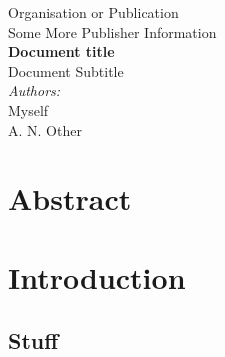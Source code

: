 \documentclass[a4paper, 11pt]{article}
\begin{document}
	
\begin{titlepage}
\begin{center}
	{\LARGE Organisation or Publication}\\[0.2cm]
	{\Large Some More Publisher Information}\\[1cm]
	{ \huge \bfseries Document title}\\[0.3cm]
	{ \large Document Subtitle}\\[0.7cm]
	\emph{Authors:}\\
	Myself\\
	A. N. Other\\[1.5cm]
\end{center}
\vfill
\section*{Abstract}
\lipsum[1]
\end{titlepage}
\twocolumn
\section{Introduction}	
\lipsum
\subsection{Stuff}
\lipsum
\end{document}
